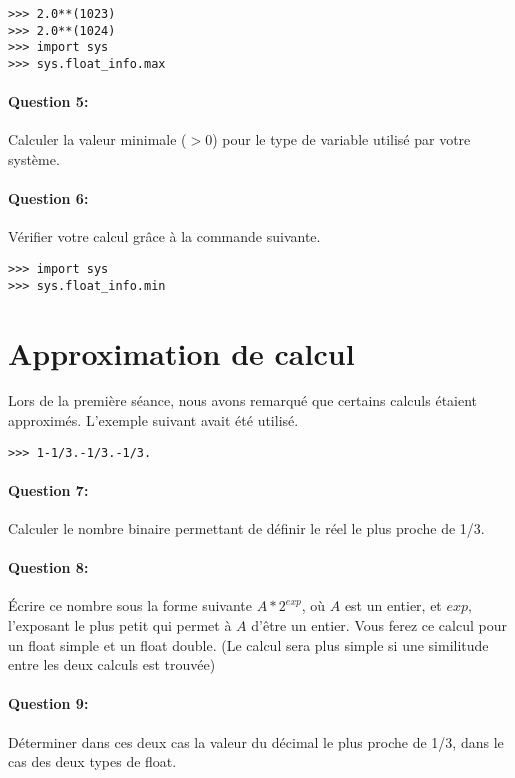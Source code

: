 \begin{verbatim}
>>> 2.0**(1023)
>>> 2.0**(1024)
>>> import sys
>>> sys.float_info.max
\end{verbatim}

\paragraph{Question 5:} Calculer la valeur minimale ($>0$) pour le type de variable utilisé par votre système.

\paragraph{Question 6:} Vérifier votre calcul grâce à la commande suivante.

\begin{verbatim}
>>> import sys
>>> sys.float_info.min
\end{verbatim}

\section{Approximation de calcul}

Lors de la première séance, nous avons remarqué que certains calculs étaient approximés. L'exemple suivant avait été utilisé.

\begin{verbatim}
>>> 1-1/3.-1/3.-1/3.
\end{verbatim}

\paragraph{Question 7:} Calculer le nombre binaire permettant de définir le réel le plus proche de 1/3.

\paragraph{Question 8:} Écrire ce nombre sous la forme suivante $A*2^{exp}$, où $A$ est un entier, et $exp$, l'exposant le plus petit qui permet à $A$ d'être un entier. Vous ferez ce calcul pour un float simple et un float double. (Le calcul sera plus simple si une similitude entre les deux calculs est trouvée)

\paragraph{Question 9:} Déterminer dans ces deux cas la valeur du décimal le plus proche de 1/3, dans le cas des deux types de float.

